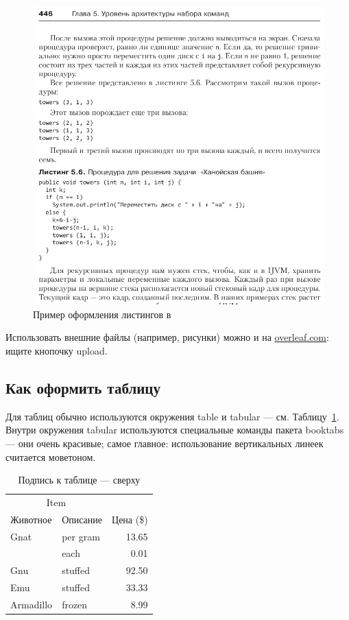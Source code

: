 \begin{figure}[p]%
\centering
\includegraphics[width=\textwidth]{img/tan-aus.png}
\caption{\label{fig:tan-aus}Пример оформления листингов в~\autocite{TanAus2013}}
\end{figure}

Использовать внешние файлы (например, рисунки) можно и на \href{http://overleaf.com}{overleaf.com}: ищите кнопочку upload.

\subsection{Как оформить таблицу}

Для таблиц обычно используются окружения table и tabular --- см. Таблицу~\ref{tab:widgets}. Внутри окружения tabular используются специальные команды пакета booktabs — они очень красивые; самое главное: использование вертикальных линеек считается моветоном.

\begin{table}
\centering
\caption{\label{tab:widgets}Подпись к таблице --- сверху}
\begin{tabular}{llr}
\toprule
\multicolumn{2}{c}{Item} \\
\cmidrule(r){1-2}
Животное  & Описание    & Цена (\$) \\
\midrule
Gnat      & per gram    & 13.65      \\
          & each        & 0.01       \\
Gnu       & stuffed     & 92.50      \\
Emu       & stuffed     & 33.33      \\
Armadillo & frozen      & 8.99       \\
\bottomrule
\end{tabular}
\end{table}

